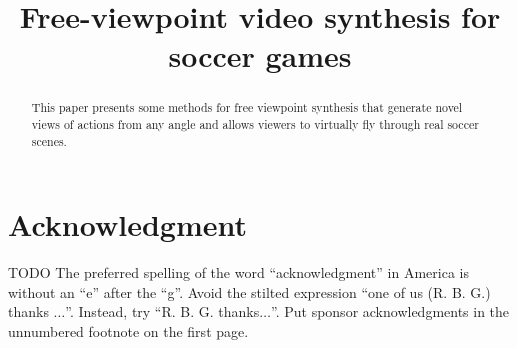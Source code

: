 \documentclass[conference]{IEEEtran}
\begin{document}
\title{Free-viewpoint video synthesis for soccer games\\
}

\author{
}

\maketitle

\begin{abstract}
This paper presents some methods for free viewpoint synthesis that generate novel views of actions from any angle and 
allows viewers to virtually fly through real soccer scenes.

\end{abstract}














\section*{Acknowledgment}
TODO
The preferred spelling of the word ``acknowledgment'' in America is without 
an ``e'' after the ``g''. Avoid the stilted expression ``one of us (R. B. 
G.) thanks $\ldots$''. Instead, try ``R. B. G. thanks$\ldots$''. Put sponsor 
acknowledgments in the unnumbered footnote on the first page.




\end{document}
